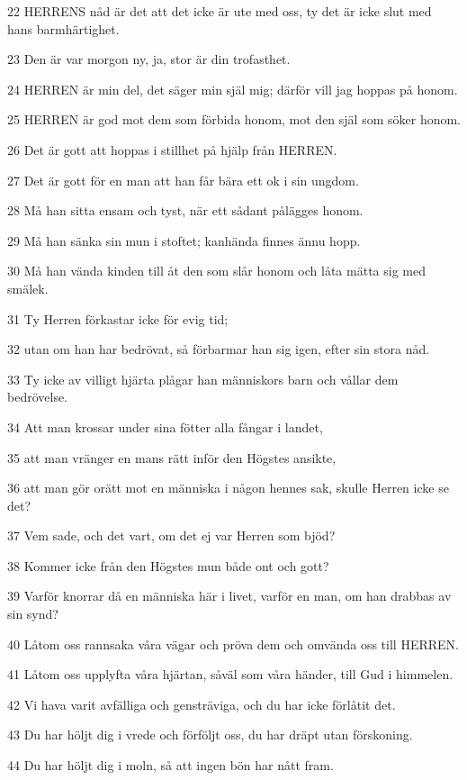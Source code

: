 \par 22 HERRENS nåd är det att det icke är ute med oss, ty det är icke slut med hans barmhärtighet.
\par 23 Den är var morgon ny, ja, stor är din trofasthet.
\par 24 HERREN är min del, det säger min själ mig; därför vill jag hoppas på honom.
\par 25 HERREN är god mot dem som förbida honom, mot den själ som söker honom.
\par 26 Det är gott att hoppas i stillhet på hjälp från HERREN.
\par 27 Det är gott för en man att han får bära ett ok i sin ungdom.
\par 28 Må han sitta ensam och tyst, när ett sådant pålägges honom.
\par 29 Må han sänka sin mun i stoftet; kanhända finnes ännu hopp.
\par 30 Må han vända kinden till åt den som slår honom och låta mätta sig med smälek.
\par 31 Ty Herren förkastar icke för evig tid;
\par 32 utan om han har bedrövat, så förbarmar han sig igen, efter sin stora nåd.
\par 33 Ty icke av villigt hjärta plågar han människors barn och vållar dem bedrövelse.
\par 34 Att man krossar under sina fötter alla fångar i landet,
\par 35 att man vränger en mans rätt inför den Högstes ansikte,
\par 36 att man gör orätt mot en människa i någon hennes sak, skulle Herren icke se det?
\par 37 Vem sade, och det vart, om det ej var Herren som bjöd?
\par 38 Kommer icke från den Högstes mun både ont och gott?
\par 39 Varför knorrar då en människa här i livet, varför en man, om han drabbas av sin synd?
\par 40 Låtom oss rannsaka våra vägar och pröva dem och omvända oss till HERREN.
\par 41 Låtom oss upplyfta våra hjärtan, såväl som våra händer, till Gud i himmelen.
\par 42 Vi hava varit avfälliga och gensträviga, och du har icke förlåtit det.
\par 43 Du har höljt dig i vrede och förföljt oss, du har dräpt utan förskoning.
\par 44 Du har höljt dig i moln, så att ingen bön har nått fram.
